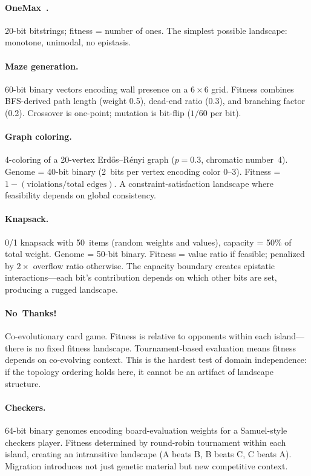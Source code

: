\documentclass[dvipsnames,format=sigconf,anonymous=true,review=true]{acmart}
\begin{document}
\paragraph{OneMax~\cite{mitchell1992royal}.}
20-bit bitstrings; fitness = number of ones. The simplest possible landscape: monotone, unimodal, no epistasis.

\paragraph{Maze generation.}
60-bit binary vectors encoding wall presence on a $6 \times 6$ grid. Fitness combines BFS-derived path length (weight 0.5), dead-end ratio (0.3), and branching factor (0.2). Crossover is one-point; mutation is bit-flip ($1/60$ per bit).

\paragraph{Graph coloring.}
4-coloring of a 20-vertex Erd\H{o}s--R\'{e}nyi graph ($p = 0.3$, chromatic number~4). Genome = 40-bit binary (2~bits per vertex encoding color 0--3). Fitness = $1 - (\text{violations}/\text{total edges})$. A constraint-satisfaction landscape where feasibility depends on global consistency.

\paragraph{Knapsack.}
0/1 knapsack with 50~items (random weights and values), capacity = 50\% of total weight. Genome = 50-bit binary. Fitness = value ratio if feasible; penalized by $2\times$ overflow ratio otherwise. The capacity boundary creates epistatic interactions---each bit's contribution depends on which other bits are set, producing a rugged landscape.

\paragraph{No~Thanks!}
Co-evolutionary card game. Fitness is relative to opponents within each island---there is no fixed fitness landscape. Tournament-based evaluation means fitness depends on co-evolving context. This is the hardest test of domain independence: if the topology ordering holds here, it cannot be an artifact of landscape structure.

\paragraph{Checkers.}
64-bit binary genomes encoding board-evaluation weights for a Samuel-style~\cite{samuel1959checkers} checkers player. Fitness determined by round-robin tournament within each island, creating an intransitive landscape (A beats B, B beats C, C beats A). Migration introduces not just genetic material but new competitive context.
\end{document}
